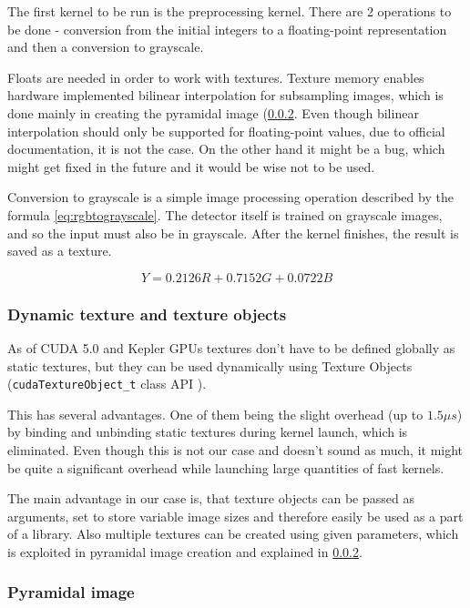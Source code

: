 The first kernel to be run is the preprocessing kernel. There are 2 operations to be done - conversion from the initial integers to a floating-point representation and then a conversion to grayscale.

Floats are needed in order to work with textures. Texture memory enables hardware implemented bilinear interpolation for subsampling images, which is done mainly in creating the pyramidal image (\ref{subsubsec:pyramidal}. Even though bilinear interpolation should only be supported for floating-point values, due to official documentation, it is not the case. On the other hand it might be a bug, which might get fixed in the future and it would be wise not to be used.

Conversion to grayscale is a simple image processing operation described by the formula \eqref{eq:rgbtograyscale}. The detector itself is trained on grayscale images, and so the input must also be in grayscale. After the kernel finishes, the result is saved as a texture.

\begin{equation} \label{eq:rgbtograyscale}
Y=0.2126R + 0.7152G + 0.0722B
\end{equation}

\subsubsection{Dynamic texture and texture objects}\label{subsubsec:dynamic-texture}

As of CUDA 5.0 and Kepler GPUs textures don't have to be defined globally as static textures, but they can be used dynamically using Texture Objects (\verb|cudaTextureObject_t| class API \cite{cuda-texture-obj}).

This has several advantages. One of them being the slight overhead (up to $1.5 \mu s$) by binding and unbinding static textures during kernel launch, which is eliminated. Even though this is not our case and doesn't sound as much, it might be quite a significant overhead while launching large quantities of fast kernels.

The main advantage in our case is, that texture objects can be passed as arguments, set to store variable image sizes and therefore easily be used as a part of a library. Also multiple textures can be created using given parameters, which is exploited in pyramidal image creation and explained in \ref{subsubsec:pyramidal}.

\subsubsection{Pyramidal image}\label{subsubsec:pyramidal}


